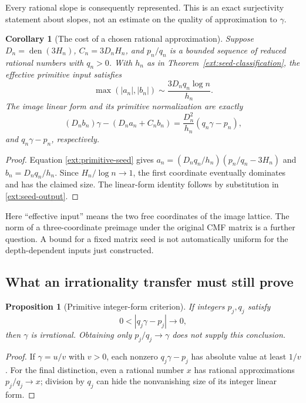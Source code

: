 \documentclass[11pt,a4paper]{article}
\numberwithin{equation}{section}
\newtheorem{proposition}[theorem]{Proposition}
\newtheorem{corollary}[theorem]{Corollary}
\theoremstyle{definition}
\theoremstyle{remark}
\begin{document}
Every rational slope is consequently represented. This is an exact
surjectivity statement about slopes, not an estimate on the quality
of approximation to $\gamma$.

\begin{corollary}[The cost of a chosen rational approximation]
\label{ext:seed-cost}
Suppose $D_n=\operatorname{den}(3H_n)$, $C_n=3D_nH_n$, and
$p_n/q_n$ is a bounded sequence of reduced rational numbers with
$q_n>0$. With $h_n$ as in Theorem~\ref{ext:seed-classification},
the effective primitive input satisfies
\[
 \max(|a_n|,|b_n|)
 \sim \frac{3D_nq_n\log n}{h_n}.
\]
The image linear form and its primitive normalization are exactly
\[
 (D_nb_n)\gamma-(D_na_n+C_nb_n)
   =\frac{D_n^2}{h_n}(q_n\gamma-p_n),
\]
and $q_n\gamma-p_n$, respectively.
\end{corollary}
\begin{proof}
Equation \eqref{ext:primitive-seed} gives
$a_n=(D_nq_n/h_n)(p_n/q_n-3H_n)$ and $b_n=D_nq_n/h_n$.
Since $H_n/\log n\to1$, the first coordinate eventually dominates
and has the claimed size. The linear-form identity follows by
substitution in \eqref{ext:seed-output}.
\end{proof}

Here ``effective input'' means the two free coordinates of the image
lattice. The norm of a three-coordinate preimage under the original
CMF matrix is a further question. A bound for a fixed matrix seed is
not automatically uniform for the depth-dependent inputs just
constructed.

\subsection{What an irrationality transfer must still prove}

\begin{proposition}[Primitive integer-form criterion]
\label{ext:gamma-criterion}
If integers $p_j,q_j$ satisfy
\[
 0<|q_j\gamma-p_j|\longrightarrow0,
\]
then $\gamma$ is irrational. Obtaining only
$p_j/q_j\to\gamma$ does not supply this conclusion.
\end{proposition}
\begin{proof}
If $\gamma=u/v$ with $v>0$, each nonzero $q_j\gamma-p_j$ has
absolute value at least $1/v$. For the final distinction, even a
rational number $x$ has rational approximations $p_j/q_j\to x$;
division by $q_j$ can hide the nonvanishing size of its integer
linear form.
\end{proof}
\end{document}
